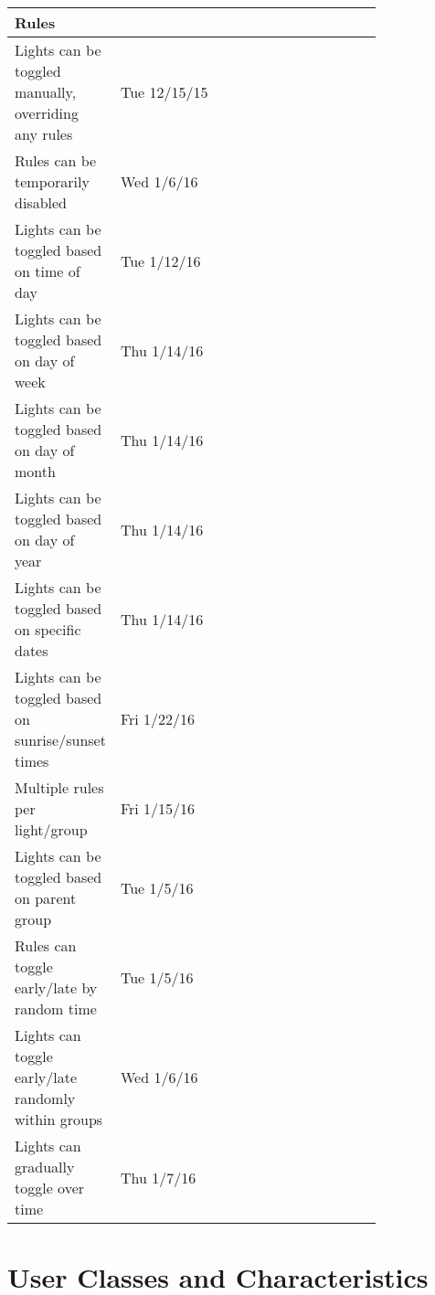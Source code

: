 \documentclass[oneside,openright]{scrreprt}
\begin{document}
\begin{tabular}{ | l | p{0.8\linewidth} | }
   Rules & \\ \hline
   
   Lights can be toggled manually, overriding any rules & Tue 12/15/15 \\ \hline
   Rules can be temporarily disabled & Wed 1/6/16 \\ \hline
   Lights can be toggled based on time of day & Tue 1/12/16 \\ \hline
   Lights can be toggled based on day of week & Thu 1/14/16 \\ \hline
   Lights can be toggled based on day of month & Thu 1/14/16 \\ \hline
   Lights can be toggled based on day of year & Thu 1/14/16 \\ \hline
   Lights can be toggled based on specific dates & Thu 1/14/16 \\ \hline
   Lights can be toggled based on sunrise/sunset times & Fri 1/22/16 \\ \hline
   Multiple rules per light/group & Fri 1/15/16 \\ \hline
   Lights can be toggled based on parent group & Tue 1/5/16 \\ \hline
   Rules can toggle early/late by random time & Tue 1/5/16 \\ \hline
   Lights can toggle early/late randomly within groups & Wed 1/6/16 \\ \hline
   Lights can gradually toggle over time & Thu 1/7/16 \\ \hline
\end{tabular}

\section{User Classes and Characteristics}

\end{document}
